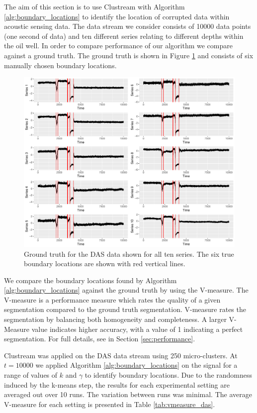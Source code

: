  The aim of this section is to use Clustream with Algorithm \ref{alg:boundary_locations} to identify the location of corrupted data within acoustic sensing data. The data stream we consider consists of 10000 data points (one second of data) and ten different series relating to different depths within the oil well. In order to compare performance of our algorithm we compare against a ground truth. The ground truth is shown in Figure \ref{fig:ground_truth_das} and consists of six manually chosen boundary locations. 

\begin{figure}[H]
  \centering
  \includegraphics[width = 15cm]{ground_truth_all}
  \caption{Ground truth for the DAS data shown for all ten series. The six true boundary locations are shown with red vertical lines. }
  \label{fig:ground_truth_das}
\end{figure}

We compare the boundary locations found by Algorithm \ref{alg:boundary_locations} against the ground truth by using the V-measure. The V-measure \citep{Rosenberg2007} is a performance measure which rates the quality of a given segmentation compared to the ground truth segmentation. V-measure rates the segmentation by balancing both homogeneity and completeness.  A larger V-Measure value indicates higher accuracy, with a value of 1 indicating a perfect segmentation. For full details, see in Section \ref{sec:performance}.


Clustream was applied on the DAS data stream using 250 micro-clusters. At $t = 10000$ we applied Algorithm \ref{alg:boundary_locations} on the signal for a range of values of $k$ and $\gamma$ to identify boundary locations. Due to the randomness induced by the k-means step, the results for each experimental setting are averaged out over 10 runs. The variation between runs was minimal. The average V-measure for each setting is presented in Table \ref{tab:vmeasure_das}.

